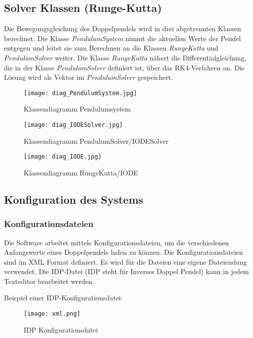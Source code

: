 \documentclass[12pt]{article}
\numberwithin{equation}{subsection}
\begin{document}
\subsection{Solver Klassen (Runge-Kutta)}
Die Bewegungsgleichung des Doppelpendels wird in drei abgetrennten Klassen berechnet. Die Klasse \textit{PendulumSystem} nimmt die aktuellen Werte der Pendel entgegen und leitet sie zum Berechnen an die Klassen \textit{RungeKutta} und \textit{PendulumSolver} weiter. Die Klasse \textit{RungeKutta} nähert die Differentialgleichung, die in der Klasse \textit{PendulumSolver} definiert ist, über das RK4-Verfahren an. Die Lösung wird als Vektor im \textit{PendulumSolver} gespeichert.

\begin{figure}[H]
	\centering
	\texttt{[image: diag\_PendulumSystem.jpg]}
	\caption{Klassendiagramm Pendulumsystem}
	\label{fig:diag:pendulumSystem}
\end{figure}

\begin{figure}[H]
	\centering
	\texttt{[image: diag\_IODESolver.jpg]}
	\caption{Klassendiagramm PendulumSolver/IODESolver}
	\label{fig:diag:iodeSolver}

\end{figure}
\begin{figure}[H]
	\centering
	\texttt{[image: diag\_IODE.jpg]}
	\caption{Klassendiagramm RungeKutta/IODE}
	\label{fig:diag:iode}
\end{figure}

\subsection{Konfiguration des Systems}
\subsubsection{Konfigurationsdateien}
Die Software arbeitet mittels Konfigurationsdateien, um die verschiedenen Anfangswerte eines Doppelpendels laden zu können. Die Konfigurationsdateien sind im XML Format definiert. Es wird für die Dateien eine eigene Dateiendung verwendet. Die IDP-Datei (IDP steht für Inverses Doppel Pendel) kann in jedem Texteditor bearbeitet werden.

Beispiel einer IDP-Konfigurationsdatei:
\begin{figure}[H]
	\centering
	\texttt{[image: xml.png]}
	\caption{IDP Konfigurationsdatei}
	\label{fig:xml}
\end{figure}
\end{document}

